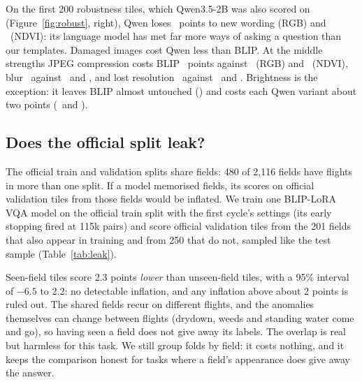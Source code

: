 \documentclass[10pt,twocolumn]{article}
\begin{document}
On the first 200 robustness tiles, which Qwen3.5-2B was also scored on (Figure~\ref{fig:robust}, right), Qwen loses \servedRgbParaphraseDrop\ points to new wording (RGB) and \servedNdviParaphraseDrop\ (NDVI): its language model has met far more ways of asking a question than our templates. Damaged images cost Qwen less than BLIP. At the middle strengths JPEG compression costs BLIP \blipMidJpeg\ points against \servedRgbMidJpeg\ (RGB) and \servedNdviMidJpeg\ (NDVI), blur \blipMidBlur\ against \servedRgbMidBlur\ and \servedNdviMidBlur, and lost resolution \blipMidRes\ against \servedRgbMidRes\ and \servedNdviMidRes. Brightness is the exception: it leaves BLIP almost untouched (\blipMidLight) and costs each Qwen variant about two points (\servedRgbMidLight\ and \servedNdviMidLight).

\subsection{Does the official split leak?}
The official train and validation splits share fields: 480 of 2,116 fields have flights in more than one split. If a model memorised fields, its scores on official validation tiles from those fields would be inflated. We train one BLIP-LoRA VQA model on the official train split with the first cycle's settings (its early stopping fired at 115k pairs) and score official validation tiles from the 201 fields that also appear in training and from 250 that do not, sampled like the test sample (Table~\ref{tab:leak}).

\begin{table}[t]\centering\small
\caption{Leakage test: one model trained on the official train split, scored on official validation tiles. The interval on the difference resamples the fields of each half independently.}\label{tab:leak}\end{table}

Seen-field tiles score 2.3 points \emph{lower} than unseen-field tiles, with a 95\% interval of $-6.5$ to 2.2: no detectable inflation, and any inflation above about 2 points is ruled out. The shared fields recur on different flights, and the anomalies themselves can change between flights (drydown, weeds and standing water come and go), so having seen a field does not give away its labels. The overlap is real but harmless for this task. We still group folds by field: it costs nothing, and it keeps the comparison honest for tasks where a field's appearance does give away the answer.
\end{document}
